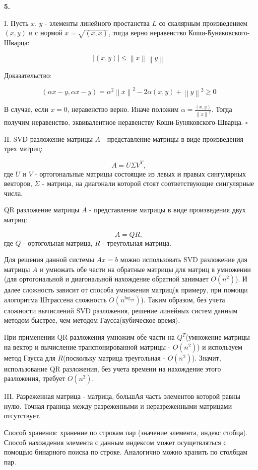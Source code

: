 \documentclass[12pt]{article}
\newcommand\norm[1]{\left\lVert#1\right\rVert}
\begin{document}
\begin{center}
	\textbf{5.}
\end{center}

I. Пусть $x,\,y$ - элементы линейного простанства $L$ со скалярным произведением $(x,y)$ и с нормой $x = \sqrt{(x,x)}$, тогда верно неравенство Коши-Буняковского-Шварца:

$$|(x,y)|\leq \norm{x}\norm{y}$$

Доказательство:

$$(\alpha x -y, \alpha x - y) = \alpha^2 \norm{x}^2-2\alpha(x,y)+\norm{y}^2\geq 0$$

В случае, если $x=0$, неравенство верно. Иначе положим $\alpha = \frac{(x,y)}{\norm{x}^2}$. Тогда получим неравенство, эквивалентное неравенству Коши-Буняковского-Шварца. $\square$

II. SVD разложение матрицы $A$ - представление матрицы в виде произведения трех матриц:

$$A = U\Sigma V^T,$$
где $U$ и $V$ - ортогональные матрицы состоящие из левых и правых сингулярных векторов, $\Sigma$ - матрица, на диагонали которой стоят соответствующие сингулярные числа.

QR разложение матрицы $A$ - представление матрицы в виде произведения двух матриц:

$$A = QR,$$
где $Q$ - ортогольная матрица, $R$ - треугольная матрица.

Для решения данной системы $Ax=b$ можно использовать SVD разложение для матрицы $A$ и умножать обе части на обратные матрицы для матриц в умножении (для ортогональной и диагональной нахождение обратной занимает $O(n^2)$). И далее сложность зависит от способа умножения матриц(к примеру, при помощи алогоритма Штрассена сложность $O(n^{\log_27})$). Таким образом, без учета сложности вычислений SVD разложения, решение линейных систем данным методом быстрее, чем методом Гаусса(кубическое время).

При применении QR разложения умножим обе части на $Q^T$(умножение матрицы на вектор и вычисление транспонированной матрицы - $O(n^2)$) и используем метод Гаусса для $R$(поскольку матрица треугольная - $O(n^2)$). Значит, использование
QR разложения, без учета времени на нахождение этого разложения, требует $O(n^2)$.

III. Разреженная матрица - матрица, большАя часть элементов которой равны нулю. Точная граница между разреженными и неразреженными матрицами отсутствует.

Способ хранения: хранение по строкам пар (значение элемента, индекс стобца). Способ нахождения элемента с данным индексом может осущетвляться с помощью бинарного поиска по строке. Аналогично можно хранить по столбцам пар.
\end{document}
